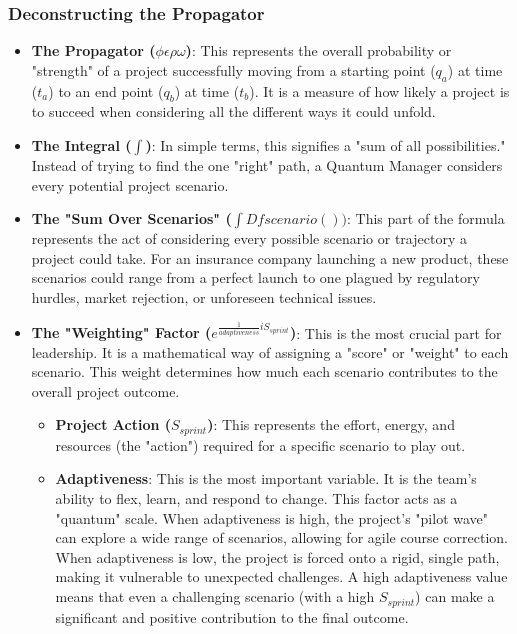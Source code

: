 \documentclass{article}
\begin{document}
\subsubsection*{Deconstructing the Propagator}
\begin{itemize}
\item \textbf{The Propagator ($\phi \epsilon \rho \omega$)}: This represents the overall probability or "strength" of a project successfully moving from a starting point ($q_a$) at time ($t_a$) to an end point ($q_b$) at time ($t_b$). It is a measure of how likely a project is to succeed when considering all the different ways it could unfold.
\item \textbf{The Integral ($\int$)}: In simple terms, this signifies a "sum of all possibilities." Instead of trying to find the one "right" path, a Quantum Manager considers every potential project scenario.
\item \textbf{The "Sum Over Scenarios" ($\int Dfscenario())$}: This part of the formula represents the act of considering every possible scenario or trajectory a project could take. For an insurance company launching a new product, these scenarios could range from a perfect launch to one plagued by regulatory hurdles, market rejection, or unforeseen technical issues.
\item \textbf{The "Weighting" Factor ($e^{\frac{1}{adaptiveness}iS_{sprint}}$)}: This is the most crucial part for leadership. It is a mathematical way of assigning a "score" or "weight" to each scenario. This weight determines how much each scenario contributes to the overall project outcome.
\begin{itemize}
\item \textbf{Project Action ($S_{sprint}$)}: This represents the effort, energy, and resources (the "action") required for a specific scenario to play out.
\item \textbf{Adaptiveness}: This is the most important variable. It is the team's ability to flex, learn, and respond to change. This factor acts as a "quantum" scale. When adaptiveness is high, the project's "pilot wave" can explore a wide range of scenarios, allowing for agile course correction. When adaptiveness is low, the project is forced onto a rigid, single path, making it vulnerable to unexpected challenges. A high adaptiveness value means that even a challenging scenario (with a high $S_{sprint}$) can make a significant and positive contribution to the final outcome.
\end{itemize}
\end{itemize}
\end{document}
